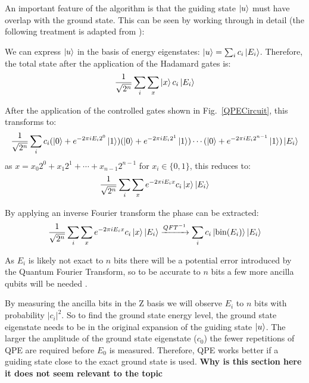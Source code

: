 \documentclass[twoside]{article}
\begin{document}
An important feature of the algorithm is that the guiding state $\ket{u}$ must have overlap with the ground state. This can be seen by working through in detail (the following treatment is adapted from \cite{chemistryReview}):\\
\begin{itemlist}
\item We can express $\ket{u}$ in the basis of energy eigenstates: $\ket{u} = \sum_i c_i \ket{E_i}$. Therefore, the total state after the application of the Hadamard gates is: 
        \begin{equation}
                \frac{1}{\sqrt{2^n}} \sum_i \sum_x \ket{x} c_i \ket{E_i}
        \end{equation}
\item After the application of the controlled gates shown in Fig.~\ref{QPECircuit}, this transforms to:
        \begin{equation}
        \frac{1}{\sqrt{2^n}} \sum_i c_i (\ket{0} + e^{-2\pi i  E_i 2^0}\ket{1})(\ket{0} + e^{-2\pi i E_i 2^1} \ket{1}) \cdots (\ket{0} + e^{-2\pi i  E_i 2^{n-1}}\ket{1}) \ket{E_i} \end{equation}
        as $x = x_0 2^0 + x_1 2^1 + \cdots + x_{n-1} 2^{n-1}$ for $x_i \in \{0,1\}$, this reduces to:
        \begin{equation}
                \frac{1}{\sqrt{2^n}} \sum_i \sum_x e^{-2\pi i E_i x}c_i \ket{x}  \ket{E_i}
        \end{equation}
\item By applying an inverse Fourier transform the phase can be extracted:
        \begin{equation}
                \frac{1}{\sqrt{2^n}} \sum_i \sum_x e^{-2\pi i E_i x}c_i \ket{x}  \ket{E_i} \xrightarrow{QFT^{-1}} \sum_i c_i \ket{\text{bin}(E_i)} \ket{E_i}
        \end{equation}
\item As $E_i$ is likely not exact to $n$ bits there will be a potential error introduced by the Quantum Fourier Transform, so to be accurate to $n$ bits a few more ancilla qubits will be needed \cite{nielsenChuang}.
\item By measuring the ancilla bits in the Z basis we will observe $E_i$ to $n$ bits with probability $|c_i|^2$.  So to find the ground state energy level, the ground state eigenstate needs to be in the original expansion of the guiding state $\ket{u}$. The larger the amplitude of the ground state eigenstate ($c_0$) the fewer repetitions of QPE are required before $E_0$ is measured. Therefore, QPE works better if a guiding state close to the exact ground state is used. \textbf{Why is this section here it does not seem relevant to the topic}
\end{itemlist}
\end{document}
